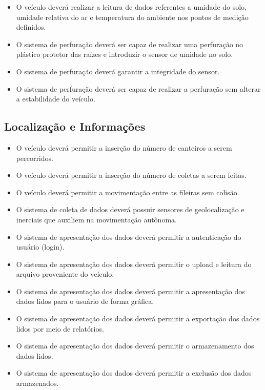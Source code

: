    \begin{itemize}
      \item O veículo deverá realizar a leitura de dados referentes a umidade do solo, umidade relativa do ar e temperatura do ambiente nos pontos de medição definidos.
      \item O sistema de perfuração deverá ser capaz de realizar uma perfuração no plástico protetor das raízes e introduzir o sensor de umidade no solo.
      \item O sistema de perfuração deverá garantir a integridade do sensor.
      \item O sistema de perfuração deverá ser capaz de realizar a perfuração sem alterar a estabilidade do veículo.
    \end{itemize}

    \subsection{Localização e Informações}

      \begin{itemize}
        \item O veículo deverá permitir a inserção do número de canteiros a serem percorridos.
        \item O veículo deverá permitir a inserção do número de coletas a serem feitas.
        \item O veículo deverá permitir a movimentação entre as fileiras sem colisão.
        \item O sistema de coleta de dados deverá possuir sensores de geolocalização e inerciais que auxiliem na movimentação autônoma.
        \item O sistema de apresentação dos dados deverá permitir a autenticação do usuário (login).
        \item O sistema de apresentação dos dados deverá permitir o upload e leitura do arquivo proveniente do veículo.
        \item O sistema de apresentação dos dados deverá permitir a apresentação dos dados lidos para o usuário de forma gráfica.
        \item O sistema de apresentação dos dados deverá permitir a exportação dos dados lidos por meio de relatórios.
        \item O sistema de apresentação dos dados deverá permitir o armazenamento dos dados lidos.
        \item O sistema de apresentação dos dados deverá permitir a exclusão dos dados armazenados.
      \end{itemize}
